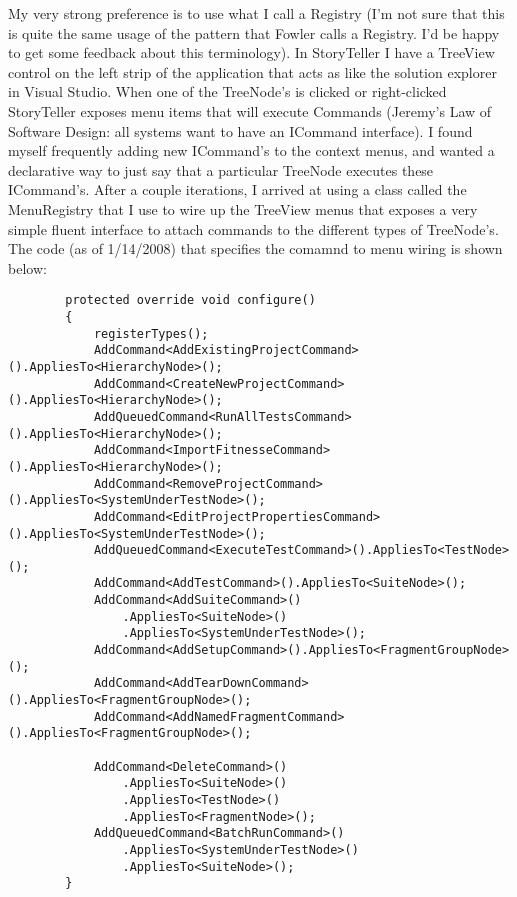 \documentclass{article}
\begin{document}
{My very strong preference is to use what I call a Registry (I'm not sure that this is quite the same usage of the pattern that Fowler calls a Registry.  I'd be happy to get some feedback about this terminology).  In StoryTeller I have a TreeView control on the left strip of the application that acts as like the solution explorer in Visual Studio.  When one of the TreeNode's is clicked or right-clicked StoryTeller exposes menu items that will execute Commands (Jeremy's Law of Software Design:  all systems want to have an ICommand interface).  I found myself frequently adding new ICommand's to the context menus, and wanted a declarative way to just say that a particular TreeNode executes these ICommand's.  After a couple iterations, I arrived at using a class called the MenuRegistry that I use to wire up the TreeView menus that exposes a very simple fluent interface to attach commands to the different types of TreeNode's.  The code (as of 1/14/2008) that specifies the comamnd to menu wiring is shown below:

\begin{lstlisting}
        protected override void configure()
        {
            registerTypes();
            AddCommand<AddExistingProjectCommand>().AppliesTo<HierarchyNode>();
            AddCommand<CreateNewProjectCommand>().AppliesTo<HierarchyNode>();
            AddQueuedCommand<RunAllTestsCommand>().AppliesTo<HierarchyNode>();
            AddCommand<ImportFitnesseCommand>().AppliesTo<HierarchyNode>();
            AddCommand<RemoveProjectCommand>().AppliesTo<SystemUnderTestNode>();
            AddCommand<EditProjectPropertiesCommand>().AppliesTo<SystemUnderTestNode>();
            AddQueuedCommand<ExecuteTestCommand>().AppliesTo<TestNode>();
            AddCommand<AddTestCommand>().AppliesTo<SuiteNode>();
            AddCommand<AddSuiteCommand>()
                .AppliesTo<SuiteNode>()
                .AppliesTo<SystemUnderTestNode>();
            AddCommand<AddSetupCommand>().AppliesTo<FragmentGroupNode>();
            AddCommand<AddTearDownCommand>().AppliesTo<FragmentGroupNode>();
            AddCommand<AddNamedFragmentCommand>().AppliesTo<FragmentGroupNode>(); 

            AddCommand<DeleteCommand>()
                .AppliesTo<SuiteNode>()
                .AppliesTo<TestNode>()
                .AppliesTo<FragmentNode>();
            AddQueuedCommand<BatchRunCommand>()
                .AppliesTo<SystemUnderTestNode>()
                .AppliesTo<SuiteNode>();
        }
\end{lstlisting}		

}
\end{document}
